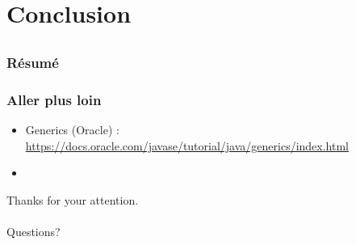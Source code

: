 \documentclass[draft]{beamer}
\DeclareRobustCommand{\todo}[1]{\ifdraft{\textbf{\textcolor{red}{[#1]}}}{}}
\begin{document}
\section{Conclusion}
\subsection{}

\begin{frame}
\frametitle{Résumé}
\todo{}
\end{frame}

\begin{frame}
\frametitle{Aller plus loin}
\begin{itemize}
 \item Generics (Oracle) : \url{https://docs.oracle.com/javase/tutorial/java/generics/index.html}
 \item \todo{}
\end{itemize}
\end{frame}

\begin{frame}
\begin{center}
Thanks for your attention.\\
~\\
Questions?\\
\end{center}
\end{frame}

\end{document}
